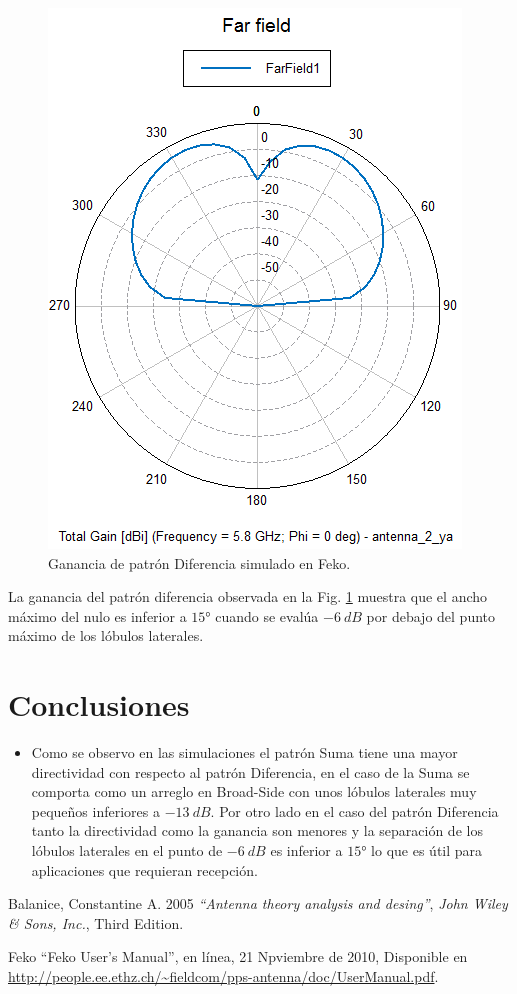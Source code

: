 \documentclass[twocolumn]{IEEEtran}
\begin{document}
\begin{figure}[H]
	\centering
		\includegraphics[scale=0.62]{ganancia.png}
	\caption{Ganancia de patrón Diferencia simulado en Feko.}
	\label{fig13}
\end{figure}
\noindent
La ganancia del patrón diferencia observada en la Fig. \ref{fig13} muestra que el ancho máximo del nulo es inferior a $15°$ cuando se evalúa $-6\ dB$ por debajo  del punto máximo de los lóbulos laterales.

\section{Conclusiones}
\begin{itemize}
 \item Como se observo en las simulaciones el patrón Suma tiene una mayor directividad con respecto al patrón Diferencia, en el caso de la Suma se comporta como un arreglo en Broad-Side con unos lóbulos laterales muy pequeños inferiores a $-13\ dB$. Por otro lado en el caso del patrón Diferencia tanto la directividad como la ganancia son menores y la separación de los lóbulos laterales en el punto de $-6\ dB$ es inferior a $15°$ lo que es útil para aplicaciones que requieran recepción.
\end{itemize}


\begin{thebibliography}{99}

 Balanice, Constantine A. 2005
{\em ``Antenna theory analysis and desing''}, \textit{John Wiley \& Sons, Inc.}, Third Edition.

 Feko ``Feko User's Manual'', en línea, 21 Npviembre de 2010, Disponible en \url{http://people.ee.ethz.ch/~fieldcom/pps-antenna/doc/UserManual.pdf}.

\end{thebibliography}
\end{document}
